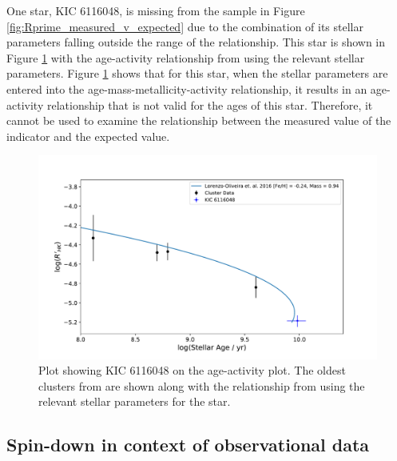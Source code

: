 One star, KIC 6116048, is missing from the sample in Figure \ref{fig:Rprime_measured_v_expected} due to the combination of its stellar parameters falling outside the range of the \citet{Lorenzo_Oliveira_etal_2016} relationship. This star is shown in Figure \ref{fig:LO_invalid_star} with the age-activity relationship from \citet{Lorenzo_Oliveira_etal_2016} using the relevant stellar parameters. Figure \ref{fig:LO_invalid_star} shows that for this star, when the stellar parameters are entered into the age-mass-metallicity-activity relationship, it results in an age-activity relationship that is not valid for the ages of this star. Therefore, it cannot be used to examine the relationship between the measured value of the \Rprime indicator and the expected value.

\begin{figure}
	\centering
    \includegraphics[scale=0.55]{Figures/4-Chromospheric_age/rhk_KIC_6116048.pdf}
    \caption[Plot of age-activity relationship for stellar parameters of KIC 6116048]{Plot showing KIC 6116048 on the age-activity plot. The oldest clusters from \citet{Mamajek_Hillenbrand_2008} are shown along with the relationship from \citet{Lorenzo_Oliveira_etal_2016} using the relevant stellar parameters for the star.}
	\label{fig:LO_invalid_star}
\end{figure}

\subsection{Spin-down in context of observational data}
\label{Chp4_discus_spindown_context}

